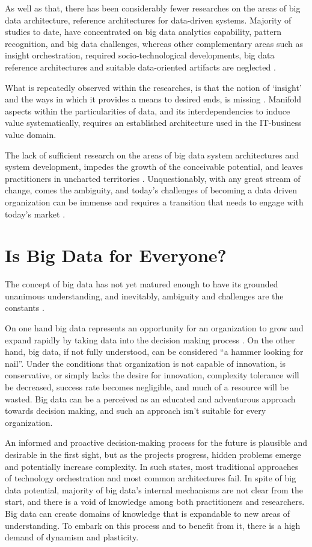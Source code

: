 As well as that, there has been considerably fewer researches on the areas of big data architecture, reference architectures for data-driven systems. Majority of studies to date, have concentrated on big data analytics capability, pattern recognition, and big data challenges, whereas other complementary areas such as insight orchestration, required socio-technological developments, big data reference architectures and suitable data-oriented artifacts are neglected \cite{Mikalef2018}.

What is repeatedly observed within the researches, is that the notion of ‘insight’ and the ways in which it provides a means to desired ends, is missing \cite{Driest2016, Chen2016b, Chen2015}. Manifold aspects within the particularities of data, and its interdependencies to induce value systematically, requires an established architecture used in the IT-business value domain.

The lack of sufficient research on the areas of big data system architectures and system development, impedes the growth of the conceivable potential, and leaves practitioners in uncharted territories \cite{Mikalef2018}. Unquestionably, with any great stream of change, comes the ambiguity, and today’s challenges of becoming a data driven organization can be immense and requires a transition that needs to engage with today’s market \cite{McAfee2012}.

\section{Is Big Data for Everyone?}

The concept of big data has not yet matured enough to have its grounded unanimous understanding, and inevitably, ambiguity and challenges are the constants \cite{Akhtar2019}.

On one hand big data represents an opportunity for an organization to grow and expand rapidly by taking data into the decision making process \cite{Chen2016b}. On the other hand, big data, if not fully understood, can be considered “a hammer looking for nail”. Under the conditions that organization is not capable of innovation, is conservative, or simply lacks the desire for innovation, complexity tolerance will be decreased, success rate becomes negligible, and much of a resource will be wasted. Big data can be a perceived as an educated and adventurous approach towards decision making, and such an approach isn’t suitable for every organization.

An informed and proactive decision-making process for the future is plausible and desirable in the first sight, but as the projects progress, hidden problems emerge and potentially increase complexity. In such states, most traditional approaches of technology orchestration and most common architectures fail. In spite of big data potential, majority of big data’s internal mechanisms are not clear from the start, and there is a void of knowledge among both practitioners and researchers. Big data can create domains of knowledge that is expandable to new areas of understanding. To embark on this process and to benefit from it, there is a high demand of dynamism and plasticity.


